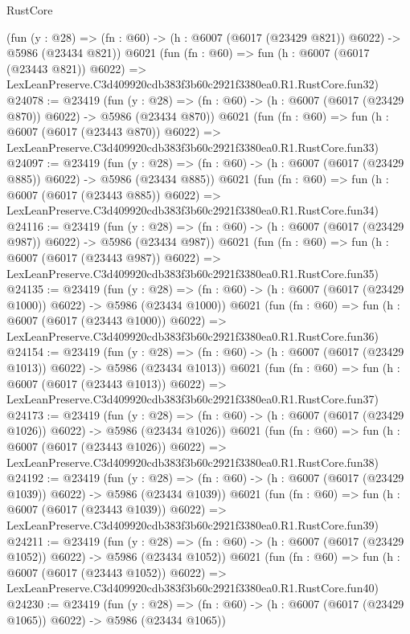 \begin{lexlean}{RustCore}
\begin{coremodule}
    (fun (y : @28) => (fn : @60) -> (h : @6007 (@6017 (@23429 @821)) @6022) -> @5986 (@23434 @821))
    @6021
    (fun (fn : @60) =>
    fun (h : @6007 (@6017 (@23443 @821)) @6022) =>
    LexLeanPreserve.C3d409920cdb383f3b60c2921f3380ea0.R1.RustCore.fun32)
@24078 := @23419
    (fun (y : @28) => (fn : @60) -> (h : @6007 (@6017 (@23429 @870)) @6022) -> @5986 (@23434 @870))
    @6021
    (fun (fn : @60) =>
    fun (h : @6007 (@6017 (@23443 @870)) @6022) =>
    LexLeanPreserve.C3d409920cdb383f3b60c2921f3380ea0.R1.RustCore.fun33)
@24097 := @23419
    (fun (y : @28) => (fn : @60) -> (h : @6007 (@6017 (@23429 @885)) @6022) -> @5986 (@23434 @885))
    @6021
    (fun (fn : @60) =>
    fun (h : @6007 (@6017 (@23443 @885)) @6022) =>
    LexLeanPreserve.C3d409920cdb383f3b60c2921f3380ea0.R1.RustCore.fun34)
@24116 := @23419
    (fun (y : @28) => (fn : @60) -> (h : @6007 (@6017 (@23429 @987)) @6022) -> @5986 (@23434 @987))
    @6021
    (fun (fn : @60) =>
    fun (h : @6007 (@6017 (@23443 @987)) @6022) =>
    LexLeanPreserve.C3d409920cdb383f3b60c2921f3380ea0.R1.RustCore.fun35)
@24135 := @23419
    (fun (y : @28) =>
    (fn : @60) -> (h : @6007 (@6017 (@23429 @1000)) @6022) -> @5986 (@23434 @1000))
    @6021
    (fun (fn : @60) =>
    fun (h : @6007 (@6017 (@23443 @1000)) @6022) =>
    LexLeanPreserve.C3d409920cdb383f3b60c2921f3380ea0.R1.RustCore.fun36)
@24154 := @23419
    (fun (y : @28) =>
    (fn : @60) -> (h : @6007 (@6017 (@23429 @1013)) @6022) -> @5986 (@23434 @1013))
    @6021
    (fun (fn : @60) =>
    fun (h : @6007 (@6017 (@23443 @1013)) @6022) =>
    LexLeanPreserve.C3d409920cdb383f3b60c2921f3380ea0.R1.RustCore.fun37)
@24173 := @23419
    (fun (y : @28) =>
    (fn : @60) -> (h : @6007 (@6017 (@23429 @1026)) @6022) -> @5986 (@23434 @1026))
    @6021
    (fun (fn : @60) =>
    fun (h : @6007 (@6017 (@23443 @1026)) @6022) =>
    LexLeanPreserve.C3d409920cdb383f3b60c2921f3380ea0.R1.RustCore.fun38)
@24192 := @23419
    (fun (y : @28) =>
    (fn : @60) -> (h : @6007 (@6017 (@23429 @1039)) @6022) -> @5986 (@23434 @1039))
    @6021
    (fun (fn : @60) =>
    fun (h : @6007 (@6017 (@23443 @1039)) @6022) =>
    LexLeanPreserve.C3d409920cdb383f3b60c2921f3380ea0.R1.RustCore.fun39)
@24211 := @23419
    (fun (y : @28) =>
    (fn : @60) -> (h : @6007 (@6017 (@23429 @1052)) @6022) -> @5986 (@23434 @1052))
    @6021
    (fun (fn : @60) =>
    fun (h : @6007 (@6017 (@23443 @1052)) @6022) =>
    LexLeanPreserve.C3d409920cdb383f3b60c2921f3380ea0.R1.RustCore.fun40)
@24230 := @23419
    (fun (y : @28) =>
    (fn : @60) -> (h : @6007 (@6017 (@23429 @1065)) @6022) -> @5986 (@23434 @1065))

\end{coremodule}
\end{lexlean}
